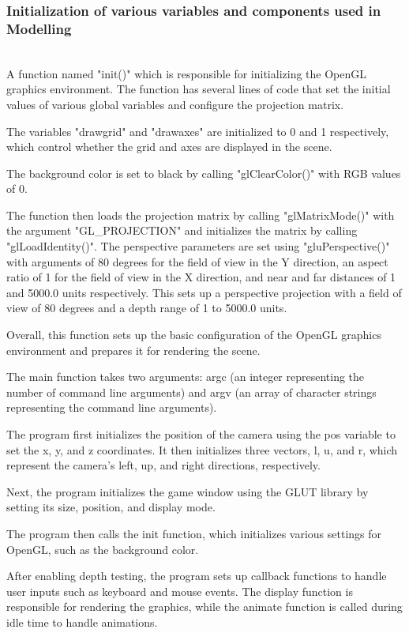 \documentclass[12pt,a4]{article}
\begin{document}
{\subsubsection{Initialization of various variables and components used in Modelling}\\


A function named "init()" which is responsible for initializing the OpenGL graphics environment. The function has several lines of code that set the initial values of various global variables and configure the projection matrix.

The variables "drawgrid" and "drawaxes" are initialized to 0 and 1 respectively, which control whether the grid and axes are displayed in the scene.

The background color is set to black by calling "glClearColor()" with RGB values of 0.

The function then loads the projection matrix by calling "glMatrixMode()" with the argument "GL\_PROJECTION" and initializes the matrix by calling "glLoadIdentity()". The perspective parameters are set using "gluPerspective()" with arguments of 80 degrees for the field of view in the Y direction, an aspect ratio of 1 for the field of view in the X direction, and near and far distances of 1 and 5000.0 units respectively. This sets up a perspective projection with a field of view of 80 degrees and a depth range of 1 to 5000.0 units.

Overall, this function sets up the basic configuration of the OpenGL graphics environment and prepares it for rendering the scene.

The main function takes two arguments: argc (an integer representing the number of command line arguments) and argv (an array of character strings representing the command line arguments).

The program first initializes the position of the camera using the pos variable to set the x, y, and z coordinates. It then initializes three vectors, l, u, and r, which represent the camera's left, up, and right directions, respectively.

Next, the program initializes the game window using the GLUT library by setting its size, position, and display mode.

The program then calls the init function, which initializes various settings for OpenGL, such as the background color.

After enabling depth testing, the program sets up callback functions to handle user inputs such as keyboard and mouse events. The display function is responsible for rendering the graphics, while the animate function is called during idle time to handle animations.

}
\end{document}
